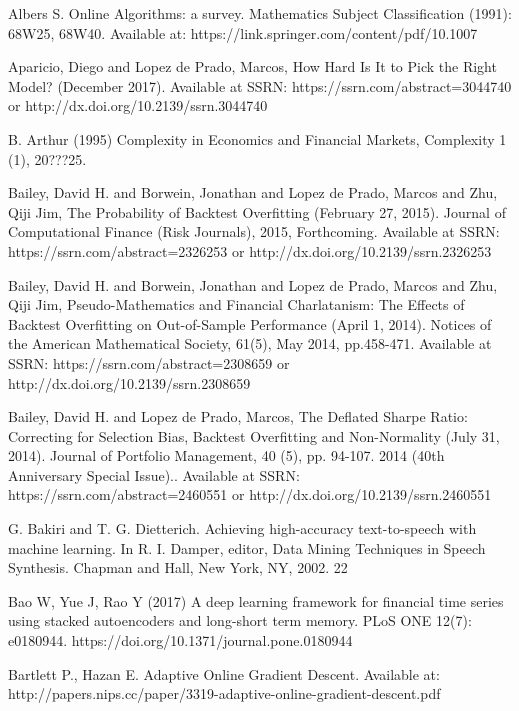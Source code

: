 \documentclass[a4paper,11pt,oneside]{article}
\theoremstyle{plain}
\theoremstyle{definition}
\begin{document}
\newpage
\begin{thebibliography}{bibliography}

Albers S. Online Algorithms: a survey. Mathematics Subject Classification (1991): 68W25, 
68W40. Available at: https://link.springer.com/content/pdf/10.1007%

Aparicio, Diego and Lopez de Prado, Marcos, How Hard Is It to Pick the Right Model? (December 2017). Available at SSRN: https://ssrn.com/abstract=3044740 or http://dx.doi.org/10.2139/ssrn.3044740

B. Arthur (1995) Complexity in Economics and Financial Markets, Complexity 1 (1), 20???25.

Bailey, David H. and Borwein, Jonathan and Lopez de Prado, Marcos and Zhu, Qiji Jim, The Probability of Backtest Overfitting (February 27, 2015). Journal of Computational Finance (Risk Journals), 2015, Forthcoming. Available at SSRN: https://ssrn.com/abstract=2326253 or http://dx.doi.org/10.2139/ssrn.2326253

Bailey, David H. and Borwein, Jonathan and Lopez de Prado, Marcos and Zhu, Qiji Jim, Pseudo-Mathematics and Financial Charlatanism: The Effects of Backtest Overfitting on Out-of-Sample Performance (April 1, 2014). Notices of the American Mathematical Society, 61(5), May 2014, pp.458-471. Available at SSRN: https://ssrn.com/abstract=2308659 or http://dx.doi.org/10.2139/ssrn.2308659

Bailey, David H. and Lopez de Prado, Marcos, The Deflated Sharpe Ratio: Correcting for Selection Bias, Backtest Overfitting and Non-Normality (July 31, 2014). Journal of Portfolio Management, 40 (5), pp. 94-107. 2014 (40th Anniversary Special Issue).. Available at SSRN: https://ssrn.com/abstract=2460551 or http://dx.doi.org/10.2139/ssrn.2460551

G. Bakiri and T. G. Dietterich. Achieving high-accuracy text-to-speech with machine learning. In R. I. Damper, editor, Data Mining Techniques in Speech Synthesis. Chapman and Hall, New York, NY, 2002. 22

Bao W, Yue J, Rao Y (2017) A deep learning framework for financial time series using stacked autoencoders and long-short term memory. PLoS ONE 12(7): e0180944. https://doi.org/10.1371/journal.pone.0180944

Bartlett P., Hazan E. Adaptive Online Gradient Descent. Available at: http://papers.nips.cc/paper/3319-adaptive-online-gradient-descent.pdf


\end{thebibliography}
\end{document}
